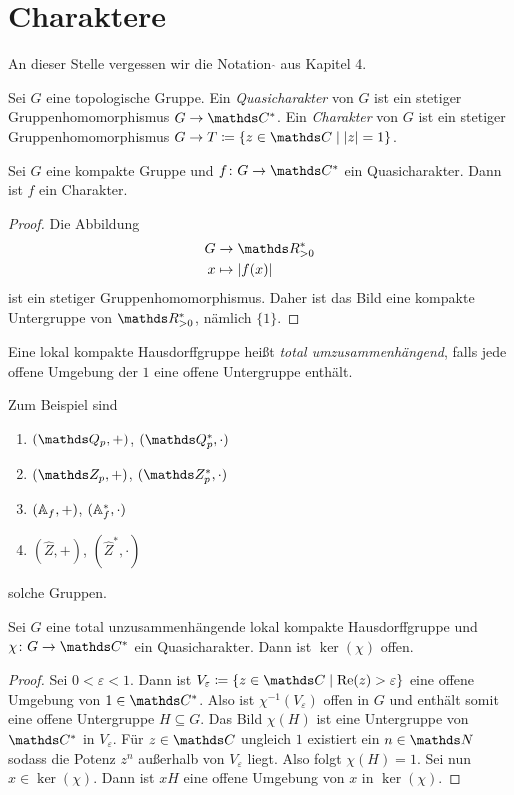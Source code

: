 \chapter{Charaktere}
An dieser Stelle vergessen wir die Notation $\hat{}$ aus Kapitel 4.
\begin{defi}
Sei $G$ eine topologische Gruppe.
Ein \emph{Quasicharakter} von $G$ ist ein stetiger Gruppenhomomorphismus $G \to \C^\ast$.
Ein \emph{Charakter} von $G$ ist ein stetiger Gruppenhomomorphismus $G\to T\coloneqq \{z \in \C \mid \abs{z}=1\}$.
\end{defi}

\begin{prop}
Sei $G$ eine kompakte Gruppe und $f \colon G \to \C^\ast$ ein Quasicharakter.
Dann ist $f$ ein Charakter.
\end{prop}
\begin{proof}
Die Abbildung
\begin{align*}
G &\to \R_{>0}^\ast\\
x&\mapsto \abs{f(x)}
\end{align*}
ist ein stetiger Gruppenhomomorphismus. Daher ist das Bild eine kompakte Untergruppe von $\R_{>0}^\ast$, nämlich $\{1\}$.
\end{proof}

\begin{defi}
Eine lokal kompakte Hausdorffgruppe heißt \emph{total umzusammenhängend}, falls jede offene Umgebung der $1$ eine offene Untergruppe enthält.
\end{defi}

\begin{bsp}
Zum Beispiel sind
\begin{enumerate}[label=\roman*)]
\item $(\Q_p,+)$, $(\Q_p^\ast,\cdot)$
\item $(\Z_p,+)$, $(\Z_p^\ast,\cdot)$
\item $(\mathbb{A}_f,+)$, $(\mathbb{A}_f^\ast,\cdot)$
\item $(\hat{Z},+)$, $(\hat{Z}^\ast,\cdot)$
\end{enumerate}
solche Gruppen.
\end{bsp}

\begin{prop}
Sei $G$ eine total unzusammenhängende lokal kompakte Hausdorffgruppe und $\chi\colon G \to \C^\ast$ ein Quasicharakter.
Dann ist $\ker(\chi)$ offen.
\end{prop}
\begin{proof}
Sei $0<\varepsilon<1$. Dann ist $V_\varepsilon\coloneqq \{z\in \C \mid \Ret(z)>\varepsilon\}$ eine offene Umgebung von $1\in \C^\ast$.
Also ist $\chi^{-1}(V_\varepsilon)$ offen in $G$ und enthält somit eine offene Untergruppe $H \subseteq G$.
Das Bild $\chi(H)$ ist eine Untergruppe von $\C^\ast$ in $V_\varepsilon$.
Für $z\in \C$ ungleich $1$ existiert ein $n\in \N$ sodass die Potenz $z^n$ außerhalb von $V_\varepsilon$ liegt.
Also folgt $\chi(H)=1$.
Sei nun $x\in \ker(\chi)$. Dann ist $xH$ eine offene Umgebung von $x$ in $\ker(\chi)$.
\end{proof}

